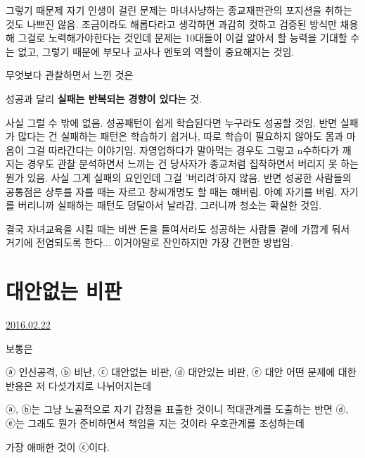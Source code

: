 그렇기 때문제 자기 인생이 걸린 문제는 마녀사냥하는 종교재판관의 포지션을 취하는 것도 나쁘진 않음.
조금이라도 해롭다라고 생각하면 과감히 컷하고 검증된 방식만 채용해 그걸로 노력해가야한다는 것인데
문제는 10대들이 이걸 알아서 할 능력을 기대할 수는 없고, 그렇기 때문에 부모나 교사나 멘토의 역할이 중요해지는 것임.
\vspace{5mm}

무엇보다 관찰하면서 느낀 것은
\vspace{5mm}

성공과 달리 \textbf{실패는 반복되는 경향이 있다}는 것.
\vspace{5mm}

사실 그럴 수 밖에 없음. 성공패턴이 쉽게 학습된다면 누구라도 성공할 것임.
반면 실패가 많다는 건 실패하는 패턴은 학습하기 쉽거나, 따로 학습이 필요하지 않아도 몸과 마음이 그걸 따라간다는 이야기임.
자영업하다가 말아먹는 경우도 그렇고 n수하다가 깨지는 경우도 관찰 분석하면서 느끼는 건
당사자가 종교처럼 집착하면서 버리지 못 하는 뭔가 있음. 사실 그게 실패의 요인인데 그걸 '버리려'하지 않음.
반면 성공한 사람들의 공통점은 상투를 자를 때는 자르고 창씨개명도 할 때는 해버림.
아예 자기를 버림. 자기를 버리니까 실패하는 패턴도 덩달아서 날라감, 그러니까 청소는 확실한 것임.
\vspace{5mm}

결국 자녀교육을 시킬 때는 비싼 돈을 들여서라도 성공하는 사람들 곁에 가깝게 둬서 거기에 전염되도록 한다...
이거야말로 잔인하지만 가장 간편한 방법임.
\vspace{5mm}






\section{대안없는 비판}
\href{https://www.kockoc.com/Apoc/645370}{2016.02.22}

\vspace{5mm}

보통은

ⓐ 인신공격, ⓑ 비난,  ⓒ 대안없는 비판, ⓓ 대안있는 비판, ⓔ 대안
어떤 문제에 대한 반응은 저 다섯가지로 나뉘어지는데
\vspace{5mm}

ⓐ, ⓑ는 그냥 노골적으로 자기 감정을 표출한 것이니 적대관계를 도출하는 반면
ⓓ, ⓔ는 그래도 뭔가 준비하면서 책임을 지는 것이라 우호관계를 조성하는데
\vspace{5mm}

가장 애매한 것이 ⓒ이다.
\vspace{5mm}

